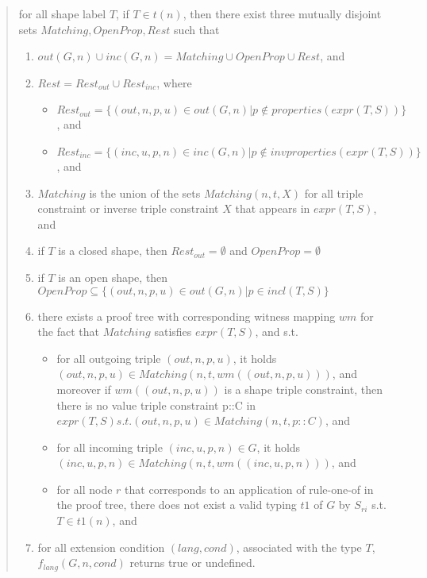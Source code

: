 \documentclass{article}
\begin{document}
\begin{quote}
for all shape label $T$, if $T \in t(n)$, then there exist three mutually disjoint sets $Matching, OpenProp, Rest$ such that
\begin{enumerate}
\item $out(G, n) \cup inc(G, n) = Matching \cup OpenProp \cup Rest$, and
\item $Rest = Rest_{out} \cup Rest_{inc}$, where 
\begin{itemize}
\item $Rest_{out} = \{(out, n, p, u) \in out(G, n) | p \notin properties(expr(T, S))\}$, and 
\item $Rest_{inc} = \{(inc, u, p, n) \in inc(G, n) | p \notin invproperties(expr(T, S))\}$, and
\end{itemize}
\item $Matching$ is the union of the sets $Matching(n, t, X)$ for all triple constraint or inverse triple constraint $X$ that appears in $expr(T, S)$, and
\item if $T$ is a closed shape, then $Rest_{out} = \emptyset$ and $OpenProp = \emptyset$
\item if $T$ is an open shape, then $OpenProp \subseteq \{(out, n, p, u) \in out(G, n) | p \in incl(T, S)\}$
\item there exists a proof tree with corresponding witness mapping $wm$ for the fact that $Matching$ satisfies $expr(T, S)$, and s.t.
\begin{itemize}
\item for all outgoing triple $(out, n, p, u)$, it holds $(out, n, p, u) \in Matching(n, t, wm((out, n, p, u)))$, and moreover if $wm((out, n, p, u))$ is a shape triple constraint, then there is no value triple constraint p::C in $expr(T, S) s.t. (out, n, p, u) \in Matching(n, t, p::C)$, and
\item for all incoming triple $(inc, u, p, n) \in G$, it holds $(inc, u, p, n) \in Matching(n, t, wm((inc, u, p, n)))$, and
\item for all node $r$ that corresponds to an application of rule-one-of in the proof tree, there does not exist a valid typing $t1$ of $G$ by $S_{ri}$ s.t. $T \in t1(n)$, and
\end{itemize}
\item for all extension condition $(lang, cond)$, associated with the type $T$, $f_{lang}(G, n, cond)$ returns true or undefined.
\end{enumerate}
\end{quote}
\end{document}

